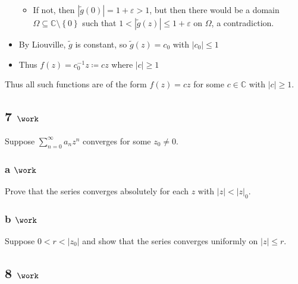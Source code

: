 \begin{solution}
\begin{itemize}
  \begin{itemize}
  \tightlist
  \item
    If not, then
    \({\left\lvert {\tilde g(0)} \right\rvert} = 1+\varepsilon> 1\), but
    then there would be a domain
    \(\Omega \subseteq {\mathbb{C}}\setminus\left\{{0}\right\}\) such
    that
    \(1 < {\left\lvert {\tilde g(z)} \right\rvert} \leq 1 +\varepsilon\)
    on \(\Omega\), a contradiction.
  \end{itemize}
\item
  By Liouville, \(\tilde g\) is constant, so \(\tilde g(z) = c_0\) with
  \({\left\lvert {c_0} \right\rvert} \leq 1\)
\item
  Thus \(f(z) = c_0^{-1}z \coloneqq cz\) where
  \({\left\lvert {c} \right\rvert}\geq 1\)
\end{itemize}

Thus all such functions are of the form \(f(z) = cz\) for some
\(c\in {\mathbb{C}}\) with \({\left\lvert {c} \right\rvert}\geq 1\).

\end{solution}

\hypertarget{work-38}{%
\subsection{\texorpdfstring{7
\(\work\)}{7 \textbackslash work}}\label{work-38}}

Suppose \(\sum_{n=0}^\infty a_n z^n\) converges for some \(z_0 \neq 0\).

\hypertarget{a-work-4}{%
\subsubsection{\texorpdfstring{a
\(\work\)}{a \textbackslash work}}\label{a-work-4}}

Prove that the series converges absolutely for each \(z\) with
\({\left\lvert {z} \right\rvert} < {\left\lvert {z} \right\rvert}_0\).

\hypertarget{b-work-6}{%
\subsubsection{\texorpdfstring{b
\(\work\)}{b \textbackslash work}}\label{b-work-6}}

Suppose \(0 < r < {\left\lvert {z_0} \right\rvert}\) and show that the
series converges uniformly on \({\left\lvert {z} \right\rvert} \leq r\).

\hypertarget{work-39}{%
\subsection{\texorpdfstring{8
\(\work\)}{8 \textbackslash work}}\label{work-39}}

